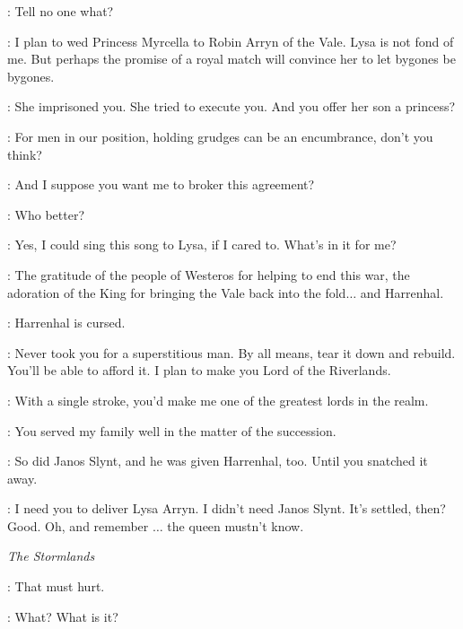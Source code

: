 
\LITTLEFINGER: Tell no one what? 

\TYRION: I plan to wed Princess Myrcella to Robin Arryn of the Vale. Lysa is not fond of me. But perhaps the promise of a royal match will convince her to let bygones be bygones. 

\LITTLEFINGER: She imprisoned you. She tried to execute you. And you offer her son a princess? 

\TYRION: For men in our position, holding grudges can be an encumbrance, don't you think? 

\LITTLEFINGER: And I suppose you want me to broker this agreement? 

\TYRION: Who better? 

\LITTLEFINGER: Yes, I could sing this song to Lysa, if I cared to. What's in it for me? 

\TYRION: The gratitude of the people of Westeros for helping to end this war, the adoration of the King for bringing the Vale back into the fold$\ldots$ and Harrenhal. 

\LITTLEFINGER: Harrenhal is cursed. 

\TYRION: Never took you for a superstitious man. By all means, tear it down and rebuild. You'll be able to afford it. I plan to make you Lord of the Riverlands. 

\LITTLEFINGER: With a single stroke, you'd make me one of the greatest lords in the realm. 

\TYRION: You served my family well in the matter of the succession. 

\LITTLEFINGER: So did Janos Slynt, and he was given Harrenhal, too. Until you snatched it away. 

\TYRION: I need you to deliver Lysa Arryn. I didn't need Janos Slynt.  It's settled, then? Good. Oh, and remember $\ldots$ the queen mustn't know. 


\scene

\textit{The Stormlands} 


\RENLY: That must hurt. 


\RENLY: What? What is it? 


